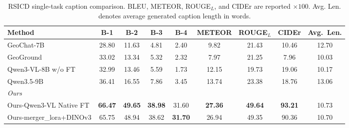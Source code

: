 \begin{table}[t]
  \caption{RSICD single-task caption comparison. BLEU, METEOR, ROUGE$_L$, and CIDEr are reported $\times 100$. Avg. Len. denotes average generated caption length in words.}
  \label{tab:RSICD_single_task_caption}
  \vspace{5pt}
  \centering
  \scriptsize
  \setlength{\tabcolsep}{4pt}
  \renewcommand{\arraystretch}{1.08}
  \begin{tabular}{lcccccccc}
    \toprule
    Method & B-1 & B-2 & B-3 & B-4 & METEOR & ROUGE$_L$ & CIDEr & Avg.\ Len. \\
    \midrule
    GeoChat-7B                         & 28.80          & 11.63          & 4.81           & 2.40           & 9.82           & 21.43          & 10.46          & 12.70 \\
    GeoGround                          & 33.02          & 13.34          & 5.32           & 2.32           & 7.97           & 21.25          & 7.96           & 10.03 \\
    Qwen3-VL-8B w/o FT                  & 32.99          & 13.46          & 5.59           & 1.73           & 12.15          & 19.73          & 19.06          & 10.17 \\
    Qwen3.5-9B                          & 36.41          & 16.55          & 7.86           & 3.45           & 13.74          & 23.38          & 18.76          & 13.06 \\
    \midrule
    \multicolumn{9}{l}{\textit{Ours}} \\
    Ours-Qwen3-VL Native FT            & \textbf{66.47} & \textbf{49.65} & \textbf{38.98} & 31.60          & \textbf{27.36} & \textbf{49.64} & \textbf{93.21} & 10.73 \\
    Ours-merger\_lora+DINOv3           & 65.75          & 48.94          & 38.62          & \textbf{31.70} & 26.94          & 49.35          & 90.36          & 10.70 \\
    \bottomrule
  \end{tabular}
\end{table}
